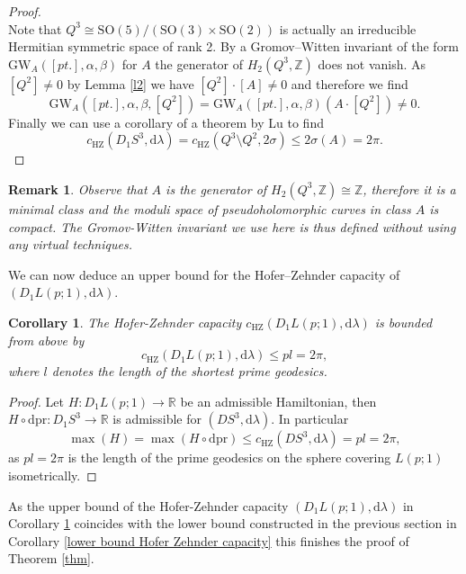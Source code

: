 \documentclass[12pt]{article}
\newtheorem{Corollary}[Definition]{Corollary}
\newtheorem{Remark}[Definition]{Remark}
\newcommand{\R}{\mathbb{R}} %
\newcommand{\Z}{\mathbb{Z}} %
\newcommand{\hz}{\mathrm{HZ}}
\newcommand{\dd}{\mathrm{d}}
\begin{document}
\begin{proof}
    \ \\
    \noindent
    Note that $Q^3\cong \mathrm{SO}(5)/(\mathrm{SO}(3)\times\mathrm{SO}(2))$ is actually an irreducible Hermitian symmetric space of rank 2. By \cite[Lem.\ 15]{LMZ13} a Gromov--Witten invariant of the form $\mathrm{GW}_A([pt.],\alpha,\beta)$ for $A$ the generator of $H_2(Q^3,\Z)$ does not vanish. As $[Q^2]\neq 0$ by Lemma \ref{l2} we have $[Q^2]\cdot [A]\neq 0$ and therefore we find
    $$
    \mathrm{GW}_A\left([pt.],\alpha,\beta,[Q^2]\right)=\mathrm{GW}_A\left([pt.],\alpha,\beta\right)\left (A\cdot [Q^2]\right)\neq 0.
    $$
    Finally we can use a corollary \cite[Cor.\ 3.2.11]{Bim} of a theorem by Lu \cite[Thm.\ 1.10]{Lu06} to find 
    $$
    c_{\hz}(D_1S^3,\dd\lambda)=c_{\hz}(Q^3\setminus Q^2,2\sigma)\leq 2\sigma(A)=2\pi.
    $$ 
\end{proof}
\begin{Remark}
    Observe that $A$ is the generator of $H_2(Q^3,\Z)\cong\Z$, therefore it is a minimal class and the moduli space of pseudoholomorphic curves in class $A$ is compact. The Gromov-Witten invariant we use here is thus defined without using any virtual techniques.
\end{Remark}
\noindent
We can now deduce an upper bound for the Hofer--Zehnder capacity of $(D_1 L(p;1),\dd\lambda)$.
\begin{Corollary}\label{upper bound Hofer Zehnder capacity}
The Hofer-Zehnder capacity $c_{\hz}(D_1L(p;1),\dd\lambda)$ is bounded from above by
    $$c_{\hz}(D_1L(p;1),\dd\lambda)\leq pl=2\pi,$$
    where $l$ denotes the length of the shortest prime geodesics.
\end{Corollary}
\begin{proof}
    Let $H:D_1L(p;1)\to \R$ be an admissible Hamiltonian, then $H\circ \dd\mathrm{pr}: D_1S^3\to\R $ is admissible for $(DS^3,\dd\lambda)$. In particular 
    $$
    \max (H)=\max (H\circ \dd\mathrm{pr}) \leq c_{\hz}(DS^3,\dd\lambda)=pl=2\pi,
    $$
    as $pl=2\pi$ is the length of the prime geodesics on the sphere covering $L(p;1)$ isometrically.
\end{proof}
\noindent
 As the upper bound of the Hofer-Zehnder capacity $(D_1 L(p;1),\dd\lambda)$ in Corollary \ref{upper bound Hofer Zehnder capacity} coincides with the lower bound constructed in the previous section in Corollary \ref{lower bound Hofer Zehnder capacity} this finishes the proof of Theorem \ref{thm}.
\end{document}
